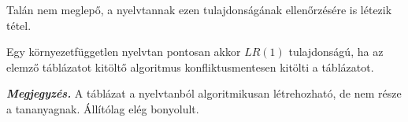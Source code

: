 Talán nem meglepő, a nyelvtannak ezen tulajdonságának ellenőrzésére is létezik tétel.

\begin{tcolorbox}
	\begin{theorem}
		Egy környezetfüggetlen nyelvtan pontosan akkor $LR(1)$ tulajdonságú, ha az
		elemző táblázatot kitöltő algoritmus konfliktusmentesen kitölti a táblázatot.
	\end{theorem}
\end{tcolorbox}

\textbf{\textit{Megjegyzés.}} A táblázat a nyelvtanból algoritmikusan létrehozható, de nem része a tananyagnak. Állítólag elég bonyolult.

